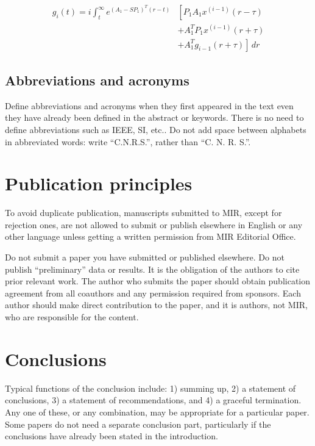 \documentclass[journal,a4paper]{IEEEtran}
\begin{document}
\begingroup
\small
\begin{equation}
\begin{aligned}
g_i(t)=i\!\int_t^\infty e^{(A_1-SP_1)^T(r-t)}
&\left[P_1A_1x^{(i-1)}(r-\tau)\right.\\
&+A_1^TP_1x^{(i-1)}(r+\tau)\\
&\left.+A_1^Tg_{i-1}(r+\tau)\right]\,dr
\end{aligned}
\end{equation}
\endgroup

\subsection{Abbreviations and acronyms}

Define abbreviations and acronyms when they first appeared in the text even they have already been defined in the abstract or keywords. There is no need to define abbreviations such as IEEE, SI, etc.. Do not add space between alphabets in abbreviated words: write ``C.N.R.S.'', rather than ``C. N. R. S.''.

\section{Publication principles}

To avoid duplicate publication, manuscripts submitted to MIR, except for rejection ones, are not allowed to submit or publish elsewhere in English or any other language unless getting a written permission from MIR Editorial Office.

Do not submit a paper you have submitted or published elsewhere. Do not publish ``preliminary'' data or results. It is the obligation of the authors to cite prior relevant work. The author who submits the paper should obtain publication agreement from all coauthors and any permission required from sponsors. Each author should make direct contribution to the paper, and it is authors, not MIR, who are responsible for the content.

\section{Conclusions}

Typical functions of the conclusion include: 1) summing up, 2) a statement of conclusions, 3) a statement of recommendations, and 4) a graceful termination. Any one of these, or any combination, may be appropriate for a particular paper. Some papers do not need a separate conclusion part, particularly if the conclusions have already been stated in the introduction.
\end{document}
